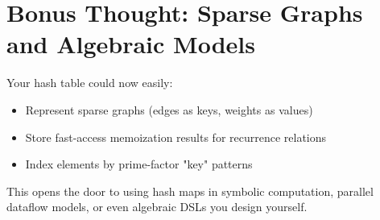 \documentclass{article}
\begin{document}
\section*{Bonus Thought: Sparse Graphs and Algebraic Models}

Your hash table could now easily:
\begin{itemize}
    \item Represent sparse graphs (edges as keys, weights as values)
    \item Store fast-access memoization results for recurrence relations
    \item Index elements by prime-factor "key" patterns
\end{itemize}

This opens the door to using hash maps in symbolic computation, parallel dataflow models, or even algebraic DSLs you design yourself.
\end{document}
